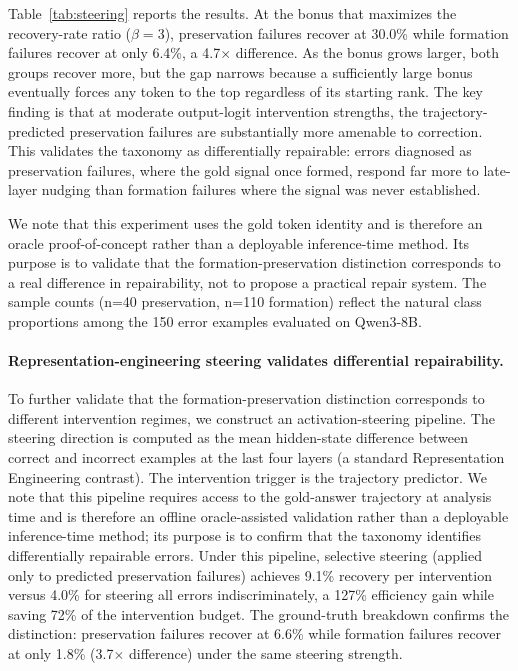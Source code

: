 \documentclass{article} %
\begin{document}
Table~\ref{tab:steering} reports the results. At the bonus that maximizes the recovery-rate ratio ($\beta = 3$), preservation failures recover at 30.0\% while formation failures recover at only 6.4\%, a 4.7$\times$ difference. As the bonus grows larger, both groups recover more, but the gap narrows because a sufficiently large bonus eventually forces any token to the top regardless of its starting rank. The key finding is that at moderate output-logit intervention strengths, the trajectory-predicted preservation failures are substantially more amenable to correction. This validates the taxonomy as differentially repairable: errors diagnosed as preservation failures, where the gold signal once formed, respond far more to late-layer nudging than formation failures where the signal was never established.

We note that this experiment uses the gold token identity and is therefore an oracle proof-of-concept rather than a deployable inference-time method. Its purpose is to validate that the formation-preservation distinction corresponds to a real difference in repairability, not to propose a practical repair system. The sample counts (n=40 preservation, n=110 formation) reflect the natural class proportions among the 150 error examples evaluated on Qwen3-8B.

\paragraph{Representation-engineering steering validates differential repairability.}
To further validate that the formation-preservation distinction corresponds to different intervention regimes, we construct an activation-steering pipeline. The steering direction is computed as the mean hidden-state difference between correct and incorrect examples at the last four layers (a standard Representation Engineering contrast). The intervention trigger is the trajectory predictor. We note that this pipeline requires access to the gold-answer trajectory at analysis time and is therefore an offline oracle-assisted validation rather than a deployable inference-time method; its purpose is to confirm that the taxonomy identifies differentially repairable errors. Under this pipeline, selective steering (applied only to predicted preservation failures) achieves 9.1\% recovery per intervention versus 4.0\% for steering all errors indiscriminately, a 127\% efficiency gain while saving 72\% of the intervention budget. The ground-truth breakdown confirms the distinction: preservation failures recover at 6.6\% while formation failures recover at only 1.8\% (3.7$\times$ difference) under the same steering strength.
\end{document}

